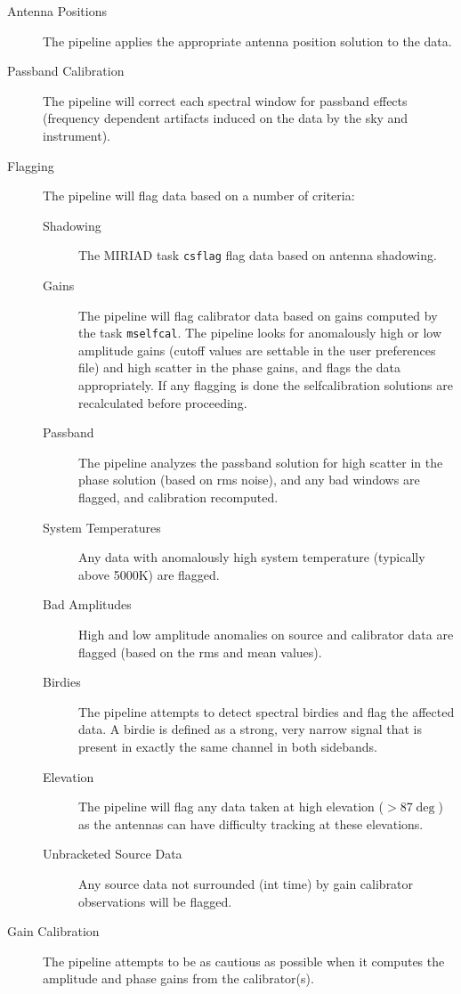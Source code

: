 \begin{description}
\item[Antenna Positions] The pipeline applies the appropriate antenna position solution to the data.
\item[Passband Calibration] The pipeline will correct each spectral window for passband effects (frequency dependent artifacts induced on the data by the sky and instrument).
\item[Flagging] The pipeline will flag data based on a number of criteria:
\begin{description}
\item[Shadowing] The MIRIAD task \verb#csflag# flag data based on antenna shadowing.
\item[Gains] The pipeline will flag calibrator data based on gains computed by the task \verb#mselfcal#. The pipeline looks for anomalously high or low amplitude gains (cutoff values are settable in the user preferences file) and high scatter in the phase gains, and flags the data appropriately. If any flagging is done the selfcalibration solutions are recalculated before proceeding.
\item[Passband] The pipeline analyzes the passband solution for high scatter in the phase solution (based on rms noise), and any bad windows are flagged, and calibration recomputed.
\item[System Temperatures] Any data with anomalously high system temperature (typically above 5000K) are flagged.
\item[Bad Amplitudes] High and low amplitude anomalies on source and calibrator data are flagged (based on the rms and mean values).
\item[Birdies] The pipeline attempts to detect spectral birdies and flag the affected data. A birdie is defined as a strong, very narrow signal that is present in exactly the same channel in both sidebands.
\item[Elevation] The pipeline will flag any data taken at high elevation ($>$87$\deg$) as the antennas can have difficulty tracking at these elevations.
\item[Unbracketed Source Data] Any source data not surrounded (int time) by gain calibrator observations will be flagged.
\end{description}
\item[Gain Calibration] The pipeline attempts to be as cautious as possible when it computes the amplitude and phase gains from the calibrator(s).
\begin{description}

\end{description}
\end{description}
